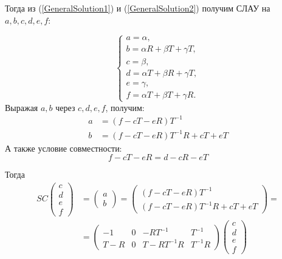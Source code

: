 \documentclass[a4 paper, 12 pt]{extarticle}
\begin{document}
   Тогда из (\ref{GeneralSolution1}) и (\ref{GeneralSolution2}) получим СЛАУ на $a, b, c, d, e, f$:

   \[
   \begin{cases}
   a = \alpha, \\
   b = \alpha R + \beta T + \gamma T, \\
   c = \beta, \\
   d = \alpha T + \beta R + \gamma T, \\
   e = \gamma, \\
   f = \alpha T + \beta T + \gamma R.
   \end{cases}
   \]
   Выражая $a, b$ через $c, d, e, f$, получим:
   \[
   \begin{aligned}
   a &= \left(f - cT - eR\right)T^{-1} \\
   b &= \left(f - cT - eR\right)T^{-1}R + cT + eT
   \end{aligned}
   \]
   А также условие совместности:
   \begin{equation}
   \label{compabilityCondition}
   f - cT - eR = d - cR - eT
   \end{equation}
   
   Тогда
   \[
   \begin{aligned}
   SC\left(
   \begin{array}{c}
   c \\
   d \\
   e \\
   f
   \end{array}\right) &= \left(\begin{array}{c}
   a \\
   b
   \end{array}\right) = 
   \left(\begin{array}{c}
   \left(f - cT - eR\right)T^{-1} \\
   \left(f - cT - eR\right)T^{-1}R + cT + eT
   \end{array}\right) =\\
   &= \left(\begin{array}{cccc}
   -1 & 0 & -RT^{-1} & T^{-1} \\
   T-R & 0 & T-RT^{-1}R & T^{-1}R
   \end{array}\right)
   \left(\begin{array}{c}
   c \\
   d \\
   e \\
   f
   \end{array}\right)
   \end{aligned}\]
   
\end{document}
